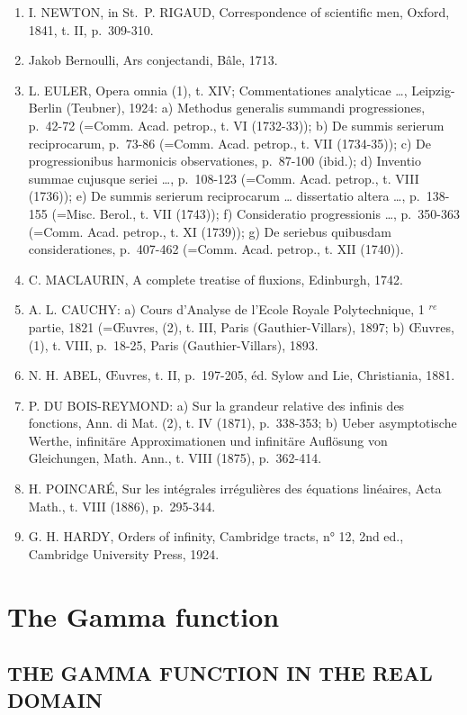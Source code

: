 \begin{enumerate}
\def\labelenumi{(\Roman{enumi})}
\item
  I. NEWTON, in St.~P. RIGAUD, Correspondence of scientific men, Oxford, 1841, t. II, p.~309-310.
\item
  Jakob Bernoulli, Ars conjectandi, Bâle, 1713.
\item
  L. EULER, Opera omnia (1), t. XIV; Commentationes analyticae \ldots, Leipzig-Berlin (Teubner), 1924: a) Methodus generalis summandi progressiones, p.~42-72 (=Comm. Acad. petrop., t. VI (1732-33)); b) De summis serierum reciprocarum, p.~73-86 (=Comm. Acad. petrop., t. VII (1734-35)); c) De progressionibus harmonicis observationes, p.~87-100 (ibid.); d) Inventio summae cujusque seriei \ldots, p.~108-123 (=Comm. Acad. petrop., t. VIII (1736)); e) De summis serierum reciprocarum \ldots{} dissertatio altera \ldots, p.~138-155 (=Misc. Berol., t. VII (1743)); f) Consideratio progressionis \ldots, p.~350-363 (=Comm. Acad. petrop., t. XI (1739)); g) De seriebus quibusdam considerationes, p.~407-462 (=Comm. Acad. petrop., t. XII (1740)).
\item
  C. MACLAURIN, A complete treatise of fluxions, Edinburgh, 1742.
\item
  A. L. CAUCHY: a) Cours d'Analyse de l'Ecole Royale Polytechnique, 1 \(^{re}\) partie, 1821 (=Œuvres, (2), t. III, Paris (Gauthier-Villars), 1897; b) Œuvres, (1), t. VIII, p.~18-25, Paris (Gauthier-Villars), 1893.
\item
  N. H. ABEL, Œuvres, t. II, p.~197-205, éd. Sylow and Lie, Christiania, 1881.
\item
  P. DU BOIS-REYMOND: a) Sur la grandeur relative des infinis des fonctions, Ann. di Mat. (2), t. IV (1871), p.~338-353; b) Ueber asymptotische Werthe, infinitäre Approximationen und infinitäre Auflösung von Gleichungen, Math. Ann., t. VIII (1875), p.~362-414.
\item
  H. POINCARÉ, Sur les intégrales irrégulières des équations linéaires, Acta Math., t. VIII (1886), p.~295-344.
\item
  G. H. HARDY, Orders of infinity, Cambridge tracts, n° 12, 2nd ed., Cambridge University Press, 1924.
\end{enumerate}

\chapter{The Gamma function}

\section{THE GAMMA FUNCTION IN THE REAL DOMAIN}

